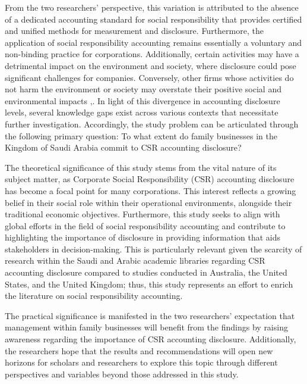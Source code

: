 \documentclass[10pt]{NSP1}
\begin{document}
From the two researchers' perspective, this variation is attributed to the absence of a dedicated accounting standard for social responsibility that provides certified and unified methods for measurement and disclosure. Furthermore, the application of social responsibility accounting remains essentially a voluntary and non-binding practice for corporations. Additionally, certain activities may have a detrimental impact on the environment and society, where disclosure could pose significant challenges for companies. Conversely, other firms whose activities do not harm the environment or society may overstate their positive social and environmental impacts \cite{ref35},. In light of this divergence in accounting disclosure levels, several knowledge gaps exist across various contexts that necessitate further investigation. Accordingly, the study problem can be articulated through the following primary question: To what extent do family businesses in the Kingdom of Saudi Arabia commit to CSR accounting disclosure?

\par\vspace{6.0pt}\vspace{6.0pt}

The theoretical significance of this study stems from the vital nature of its subject matter, as Corporate Social Responsibility (CSR) accounting disclosure has become a focal point for many corporations. This interest reflects a growing belief in their social role within their operational environments, alongside their traditional economic objectives. Furthermore, this study seeks to align with global efforts in the field of social responsibility accounting and contribute to highlighting the importance of disclosure in providing information that aids stakeholders in decision-making. This is particularly relevant given the scarcity of research within the Saudi and Arabic academic libraries regarding CSR accounting disclosure compared to studies conducted in Australia, the United States, and the United Kingdom; thus, this study represents an effort to enrich the literature on social responsibility accounting.

The practical significance is manifested in the two researchers' expectation that management within family businesses will benefit from the findings by raising awareness regarding the importance of CSR accounting disclosure. Additionally, the researchers hope that the results and recommendations will open new horizons for scholars and researchers to explore this topic through different perspectives and variables beyond those addressed in this study.
\end{document}
